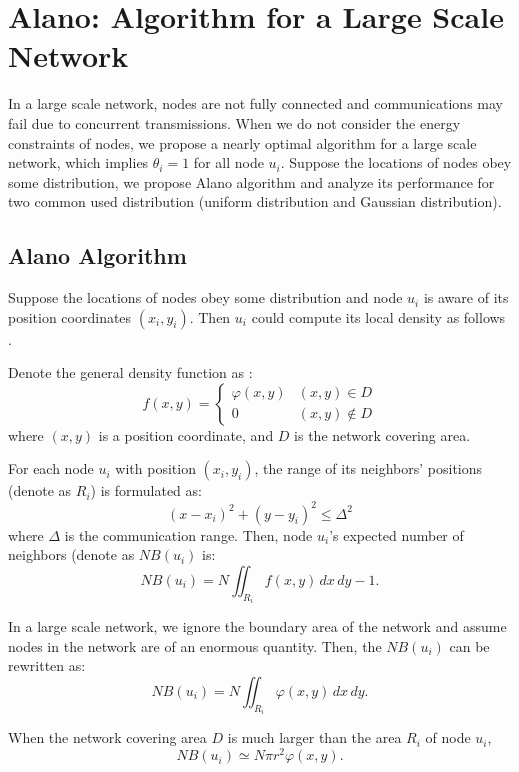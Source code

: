 \section{Alano: Algorithm for a Large Scale Network}
\label{PCN}


In a large scale network, nodes are not fully connected and communications may fail due to concurrent transmissions. 
When we do not consider the energy constraints of nodes, we propose a nearly optimal algorithm for a large scale network, which implies $\theta_i = 1$ for all node $u_i$.
Suppose the locations of nodes obey some distribution, we propose Alano algorithm and analyze its performance for two common used distribution (uniform distribution and Gaussian distribution).

\subsection{Alano Algorithm}
Suppose the locations of nodes obey some distribution and node $u_i$ is aware of its position coordinates $(x_i, y_i)$.
Then $u_i$ could compute its local density as follows \cite{meester1996continuum, wang2015connectivity}.

Denote the general density function as :
$$f(x,y)=
\begin{cases}
\varphi(x,y)& (x,y)\in D\\
0& (x,y)\notin D
\end{cases}$$
where $(x,y)$ is a position coordinate, and $D$ is the network covering area.

For each node $u_i$ with position $(x_i,y_i)$, the range of its neighbors' positions (denote as $R_i$) is formulated as:
$$
(x-x_i)^2+(y-y_i)^2 \leq \Delta^2
$$
where $\Delta$ is the communication range. Then, node $u_i$'s expected number of neighbors (denote as $NB(u_i)$ is:
$$
NB(u_i) = N\iint_{R_i} f(x,y)\,dx\,dy - 1.
$$

In a large scale network, we ignore the boundary area of the network and assume nodes in the network are of an enormous quantity. Then, the $NB(u_i)$ can be rewritten as:
$$
NB(u_i) = N\iint_{R_i} \varphi(x,y)\,dx\,dy.
$$

When the network covering area $D$ is much larger than the area $R_i$ of node $u_i$, 
\begin{equation}
\label{eqnNB}
NB(u_i) \simeq N\pi r^2 \varphi(x,y).
\end{equation}


